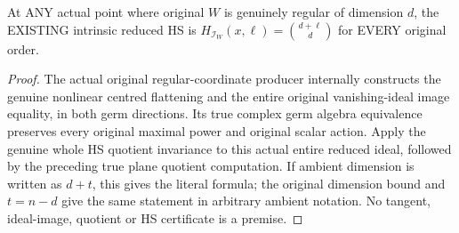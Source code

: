 \begin{theorem}
\label{hir:actual-original-regular-intrinsic-hs-binomial-profile}
\leanok
At ANY actual point where original $W$ is genuinely regular of dimension
$d$, the EXISTING intrinsic reduced HS is
$H_{\mathcal I_W}(x,\ell)=\binom{d+\ell}{d}$ for EVERY original order.
\end{theorem}
\begin{proof}
The actual original regular-coordinate producer internally constructs
the genuine nonlinear centred flattening and the entire original
vanishing-ideal image equality, in both germ directions. Its true
complex germ algebra equivalence preserves every original maximal
power and original scalar action. Apply the genuine whole HS quotient
invariance to this actual entire reduced ideal, followed by the
preceding true plane quotient computation. If ambient dimension is
written as $d+t$, this gives the literal formula; the original dimension
bound and $t=n-d$ give the same statement in arbitrary ambient notation.
No tangent, ideal-image, quotient or HS certificate is a premise.
\end{proof}

